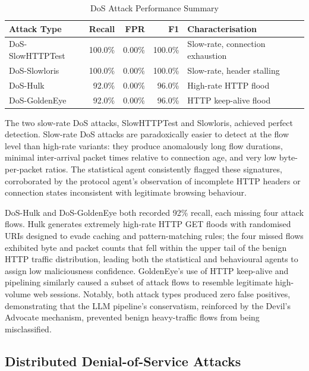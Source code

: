 \begin{table}[H]
\centering
\caption{DoS Attack Performance Summary}
\label{tab:dos-performance}
\begin{tabularx}{\textwidth}{l r r r X}
\toprule
Attack Type & Recall & FPR & F1 & Characterisation \\
\midrule
DoS-SlowHTTPTest & 100.0\% & 0.00\% & 100.0\% & Slow-rate, connection exhaustion \\
DoS-Slowloris & 100.0\% & 0.00\% & 100.0\% & Slow-rate, header stalling \\
DoS-Hulk & 92.0\% & 0.00\% & 96.0\% & High-rate HTTP flood \\
DoS-GoldenEye & 92.0\% & 0.00\% & 96.0\% & HTTP keep-alive flood \\
\bottomrule
\end{tabularx}
\end{table}

The two slow-rate DoS attacks, SlowHTTPTest and Slowloris, achieved perfect detection. Slow-rate DoS attacks are paradoxically easier to detect at the flow level than high-rate variants: they produce anomalously long flow durations, minimal inter-arrival packet times relative to connection age, and very low byte-per-packet ratios. The statistical agent consistently flagged these signatures, corroborated by the protocol agent's observation of incomplete HTTP headers or connection states inconsistent with legitimate browsing behaviour.

DoS-Hulk and DoS-GoldenEye both recorded 92\% recall, each missing four attack flows. Hulk generates extremely high-rate HTTP GET floods with randomised URIs designed to evade caching and pattern-matching rules; the four missed flows exhibited byte and packet counts that fell within the upper tail of the benign HTTP traffic distribution, leading both the statistical and behavioural agents to assign low maliciousness confidence. GoldenEye's use of HTTP keep-alive and pipelining similarly caused a subset of attack flows to resemble legitimate high-volume web sessions. Notably, both attack types produced zero false positives, demonstrating that the LLM pipeline's conservatism, reinforced by the Devil's Advocate mechanism, prevented benign heavy-traffic flows from being misclassified.

\subsection{Distributed Denial-of-Service Attacks}
\label{sec:ddos-attacks}

